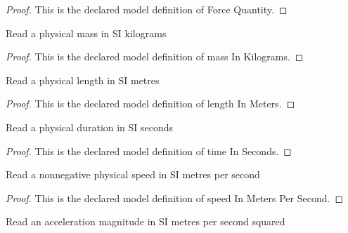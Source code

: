 \begin{proof}
  This is the declared model definition of Force Quantity.
\end{proof}
\begin{definition}
  \label{def:physics:phyx-mini-0807:phyxminiproblems-problemphyxmini0807-massinkilograms}
  Read a physical mass in SI kilograms
\end{definition}
\begin{proof}
  This is the declared model definition of mass In Kilograms.
\end{proof}
\begin{definition}
  \label{def:physics:phyx-mini-0807:phyxminiproblems-problemphyxmini0807-lengthinmeters}
  Read a physical length in SI metres
\end{definition}
\begin{proof}
  This is the declared model definition of length In Meters.
\end{proof}
\begin{definition}
  \label{def:physics:phyx-mini-0807:phyxminiproblems-problemphyxmini0807-timeinseconds}
  Read a physical duration in SI seconds
\end{definition}
\begin{proof}
  This is the declared model definition of time In Seconds.
\end{proof}
\begin{definition}
  \label{def:physics:phyx-mini-0807:phyxminiproblems-problemphyxmini0807-speedinmeterspersecond}
  Read a nonnegative physical speed in SI metres per second
\end{definition}
\begin{proof}
  This is the declared model definition of speed In Meters Per Second.
\end{proof}
\begin{definition}
  \label{def:physics:phyx-mini-0807:phyxminiproblems-problemphyxmini0807-accelerationinmeterspersecondsquared}
  Read an acceleration magnitude in SI metres per second squared
\end{definition}
